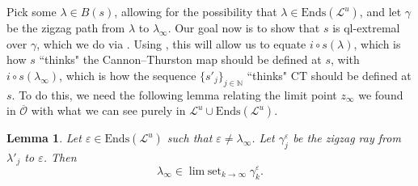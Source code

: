 \documentclass[11pt]{amsart}
\renewcommand{\l}{\lambda}
\newcommand{\mc}{\mathcal}
\newcommand{\N}{\mathbb{N}}
\newcommand{\orb}{\mathcal{O}}
\newcommand{\Ends}{\mathrm{Ends}}
\newcommand{\ct}{\mathrm{CT}}
\newcommand{\vep}{\varepsilon}
\DeclareMathOperator*{\limset}{\mathrm{lim}\; \mathrm{set}}
\numberwithin{equation}{section}
\newtheorem{lemma}[equation]{Lemma}
\theoremstyle{definition}
\begin{document}
Pick some $\l\in B(s)$, allowing for the possibility that $\l\in\Ends(\mc L^u)$, and let $\gamma$ be the zigzag path from $\l$ to $\l_\infty$. Our goal now is to show that $s$ is ql-extremal over $\gamma$, which we do via . Using , this will allow us to equate $i\circ s(\l)$, which is how $s$ ``thinks" the Cannon--Thurston map should be defined at $s$, with $i\circ s(\l_\infty)$, which is how the sequence $\{s'_j\}_{j\in\N}$ ``thinks" $\ct$ should be defined at $s$. To do this, we need the following lemma relating the limit point $z_\infty$ we found in $\overline{\orb}$ with what we can see purely in $\mc L^u\cup\Ends(\mc L^u)$.



\begin{lemma}\label{lem:linf_ray}
	Let $\vep\in\Ends(\mc L^u)$ such that $\vep\neq\l_\infty$. Let $\gamma^\vep_j$ be the zigzag ray from $\l'_j$ to $\vep$. Then 
	\[
	\l_\infty\in\limset_{k\to\infty}\gamma^\vep_k.
	\]
\end{lemma}
\end{document}
